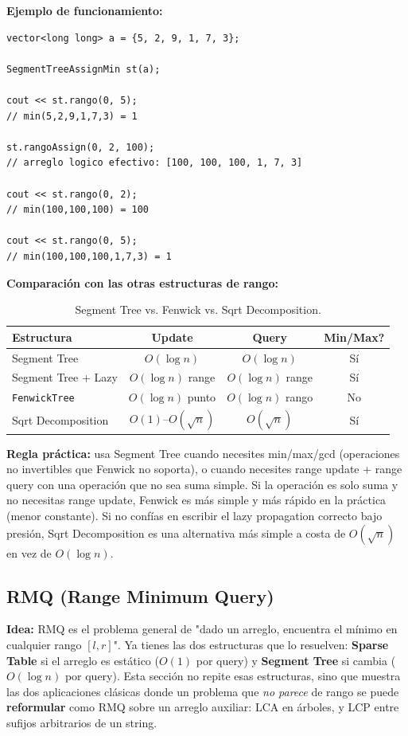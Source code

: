 \documentclass[10pt,a4paper,twocolumn]{article}
\begin{document}
\textbf{Ejemplo de funcionamiento:}

\begin{lstlisting}[style=cpp]
vector<long long> a = {5, 2, 9, 1, 7, 3};

SegmentTreeAssignMin st(a);

cout << st.rango(0, 5);
// min(5,2,9,1,7,3) = 1

st.rangoAssign(0, 2, 100);
// arreglo logico efectivo: [100, 100, 100, 1, 7, 3]

cout << st.rango(0, 2);
// min(100,100,100) = 100

cout << st.rango(0, 5);
// min(100,100,100,1,7,3) = 1
\end{lstlisting}

\textbf{Comparación con las otras estructuras de rango:}

\begin{table}[H]
\raggedright
\scriptsize
\setlength{\tabcolsep}{3pt}
\begin{tabular}{|l|c|c|c|}
\hline
\textbf{Estructura} & \textbf{Update} & \textbf{Query} & \textbf{Min/Max?} \\
\hline
Segment Tree & $O(\log n)$ & $O(\log n)$ & Sí \\
\hline
Segment Tree + Lazy & $O(\log n)$ range & $O(\log n)$ range & Sí \\
\hline
\texttt{FenwickTree} & $O(\log n)$ punto & $O(\log n)$ rango & No \\
\hline
Sqrt Decomposition & $O(1)$–$O(\sqrt n)$ & $O(\sqrt n)$ & Sí \\
\hline
\end{tabular}
\caption{Segment Tree vs. Fenwick vs. Sqrt Decomposition.}
\end{table}

\textbf{Regla práctica:} usa Segment Tree cuando necesites min/max/gcd
(operaciones no invertibles que Fenwick no soporta), o cuando
necesites range update + range query con una operación que no sea
suma simple. Si la operación es solo suma y no necesitas range
update, Fenwick es más simple y más rápido en la práctica (menor
constante). Si no confías en escribir el lazy propagation correcto
bajo presión, Sqrt Decomposition es una alternativa más simple a
costa de $O(\sqrt n)$ en vez de $O(\log n)$.


\subsection{RMQ (Range Minimum Query)}

\textbf{Idea:} RMQ es el problema general de "dado un arreglo,
encuentra el mínimo en cualquier rango $[l,r]$". Ya tienes las dos
estructuras que lo resuelven: \textbf{Sparse Table} si el arreglo es
estático ($O(1)$ por query) y \textbf{Segment Tree} si cambia
($O(\log n)$ por query). Esta sección no repite esas estructuras,
sino que muestra las dos aplicaciones clásicas donde un problema que
\emph{no parece} de rango se puede \textbf{reformular} como RMQ sobre
un arreglo auxiliar: LCA en árboles, y LCP entre sufijos arbitrarios
de un string.
\end{document}
